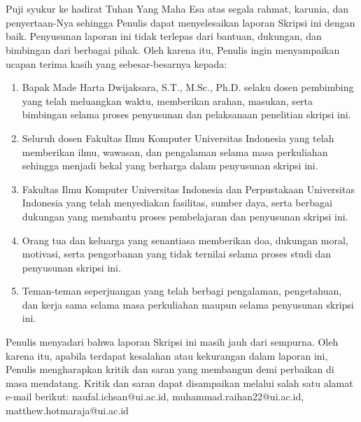 \pagestyle{onlypage}
\chapter*{\kataPengantar}
Puji syukur ke hadirat Tuhan Yang Maha Esa atas segala rahmat, karunia, dan penyertaan-Nya sehingga Penulis dapat menyelesaikan laporan Skripsi ini dengan baik. Penyusunan laporan ini tidak terlepas dari bantuan, dukungan, dan bimbingan dari berbagai pihak. Oleh karena itu, Penulis ingin menyampaikan ucapan terima kasih yang sebesar-besarnya kepada:

\begin{enumerate}
\item Bapak Made Harta Dwijaksara, S.T., M.Sc., Ph.D. selaku dosen pembimbing yang telah meluangkan waktu, memberikan arahan, masukan, serta bimbingan selama proses penyusunan dan pelaksanaan penelitian skripsi ini.

\item Seluruh dosen Fakultas Ilmu Komputer Universitas Indonesia yang telah memberikan ilmu, wawasan, dan pengalaman selama masa perkuliahan sehingga menjadi bekal yang berharga dalam penyusunan skripsi ini.

\item Fakultas Ilmu Komputer Universitas Indonesia dan Perpustakaan Universitas Indonesia yang telah menyediakan fasilitas, sumber daya, serta berbagai dukungan yang membantu proses pembelajaran dan penyusunan skripsi ini.

\item Orang tua dan keluarga yang senantiasa memberikan doa, dukungan moral, motivasi, serta pengorbanan yang tidak ternilai selama proses studi dan penyusunan skripsi ini.

\item Teman-teman seperjuangan yang telah berbagi pengalaman, pengetahuan, dan kerja sama selama masa perkuliahan maupun selama penyusunan skripsi ini.

\end{enumerate}

Penulis menyadari bahwa laporan Skripsi ini masih jauh dari sempurna. Oleh karena itu, apabila terdapat kesalahan atau kekurangan dalam laporan ini, Penulis mengharapkan kritik dan saran yang membangun demi perbaikan di masa mendatang. Kritik dan saran dapat disampaikan melalui salah satu alamat e-mail berikut: naufal.ichsan@ui.ac.id, muhammad.raihan22@ui.ac.id, matthew.hotmaraja@ui.ac.id


